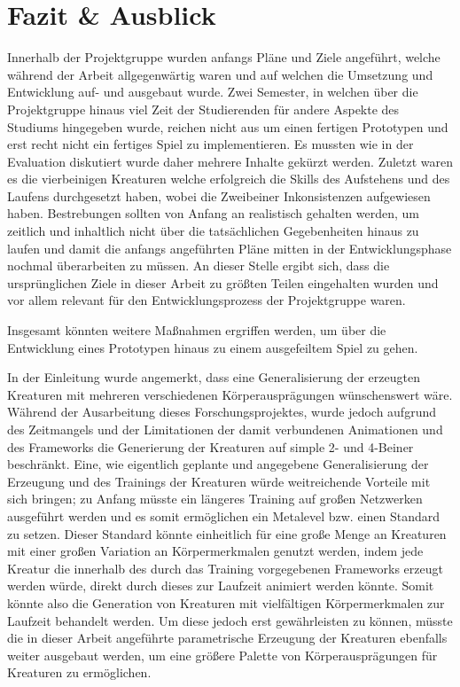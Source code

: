 \chapter{Fazit \& Ausblick}
\label{Ausblick}

Innerhalb der Projektgruppe wurden anfangs Pläne und Ziele angeführt, welche während der Arbeit allgegenwärtig waren und auf welchen die Umsetzung und Entwicklung auf- und ausgebaut wurde. Zwei Semester, in welchen über die Projektgruppe hinaus viel Zeit der Studierenden für andere Aspekte des Studiums hingegeben wurde, reichen nicht aus um einen fertigen Prototypen und erst recht nicht ein fertiges Spiel zu implementieren. Es mussten wie in der Evaluation diskutiert wurde daher mehrere Inhalte gekürzt werden. Zuletzt waren es die vierbeinigen Kreaturen welche erfolgreich die Skills des Aufstehens und des Laufens durchgesetzt haben, wobei die Zweibeiner Inkonsistenzen aufgewiesen haben. Bestrebungen sollten von Anfang an realistisch gehalten werden, um zeitlich und inhaltlich nicht über die tatsächlichen Gegebenheiten hinaus zu laufen und damit die anfangs angeführten Pläne mitten in der Entwicklungsphase nochmal überarbeiten zu müssen. An dieser Stelle ergibt sich, dass die ursprünglichen Ziele in dieser Arbeit zu größten Teilen eingehalten wurden und vor allem relevant für den Entwicklungsprozess der Projektgruppe waren.

Insgesamt könnten weitere Maßnahmen ergriffen werden, um über die Entwicklung eines Prototypen hinaus zu einem ausgefeiltem Spiel zu gehen.

In der Einleitung wurde angemerkt, dass eine Generalisierung der erzeugten Kreaturen mit mehreren verschiedenen Körperausprägungen wünschenswert wäre. Während der Ausarbeitung dieses Forschungsprojektes, wurde jedoch aufgrund des Zeitmangels und der Limitationen der damit verbundenen Animationen und des Frameworks die Generierung der Kreaturen auf simple 2- und 4-Beiner beschränkt. Eine, wie eigentlich geplante und angegebene Generalisierung der Erzeugung und des Trainings der Kreaturen würde weitreichende Vorteile mit sich bringen; zu Anfang müsste ein längeres Training auf großen Netzwerken ausgeführt werden und es somit ermöglichen ein Metalevel bzw. einen Standard zu setzen. Dieser Standard könnte einheitlich für eine große Menge an Kreaturen mit einer großen Variation an Körpermerkmalen genutzt werden, indem jede Kreatur die innerhalb des durch das Training vorgegebenen Frameworks erzeugt werden würde, direkt durch dieses zur Laufzeit animiert werden könnte. Somit könnte also die Generation von Kreaturen mit vielfältigen Körpermerkmalen zur Laufzeit behandelt werden. Um diese jedoch erst gewährleisten zu können, müsste die in dieser Arbeit angeführte parametrische Erzeugung der Kreaturen ebenfalls weiter ausgebaut werden, um eine größere Palette von Körperausprägungen für Kreaturen zu ermöglichen.

